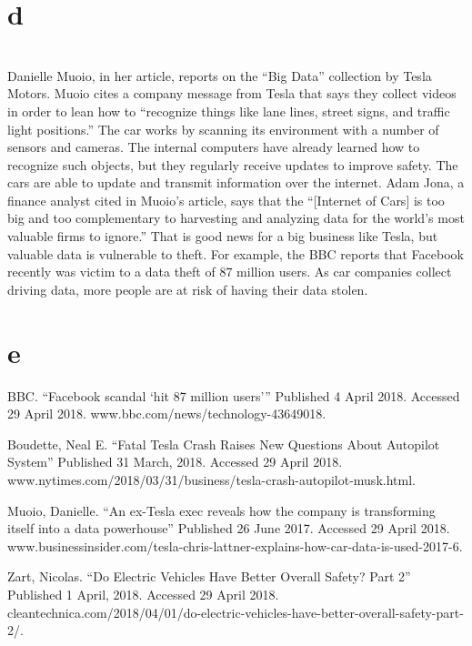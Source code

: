 \documentclass[11pt]{article}
\begin{document}
\section{d}\\
Danielle Muoio, in her article, reports on the ``Big Data'' collection by Tesla Motors. Muoio cites a company message from Tesla
that says they collect videos in order to lean how to ``recognize things like lane lines, street signs, and traffic light
positions.'' The car works by scanning its environment with a number of sensors and cameras. The internal computers have already
learned how to recognize such objects, but they regularly receive updates to improve safety. The cars are able to update and
transmit information over the internet. Adam Jona, a finance analyst cited in Muoio's article, says that the ``[Internet of
Cars] is too big and too complementary to harvesting and analyzing data for the world's most valuable firms to ignore.'' That is
good news for a big business like Tesla, but valuable data is vulnerable to theft. For example, the BBC reports that Facebook
recently was victim to a data theft of 87 million users. As car companies collect driving data, more people are at risk of having
their data stolen.\double

\section{e}\par
\begin{hangparas}{.5in}{1}
BBC. ``Facebook scandal `hit 87 million users'\thinspace'' Published 4 April 2018. Accessed 29 April 2018. www.bbc.com/news/technology-43649018.

Boudette, Neal E. ``Fatal Tesla Crash Raises New Questions About Autopilot System'' Published 31 March, 2018. Accessed 29 April 2018. www.nytimes.com/2018/03/31/business/tesla-crash-autopilot-musk.html.
 
Muoio, Danielle. ``An ex-Tesla exec reveals how the company is transforming itself into a data powerhouse'' Published 26 June 2017. Accessed 29 April 2018. www.businessinsider.com/tesla-chris-lattner-explains-how-car-data-is-used-2017-6.

Zart, Nicolas. ``Do Electric Vehicles Have Better Overall Safety? Part 2'' Published 1 April, 2018. Accessed 29 April 2018. cleantechnica.com/2018/04/01/do-electric-vehicles-have-better-overall-safety-part-2/.
\end{hangparas}\double
\end{document}
